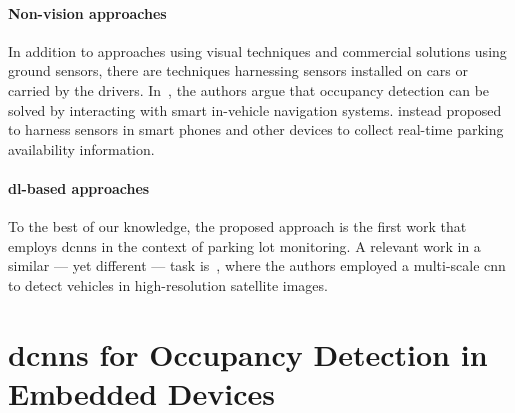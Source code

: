 \paragraph{Non-vision approaches}
In addition to approaches using visual techniques and commercial solutions using ground sensors, there are techniques harnessing sensors installed on cars or carried by the drivers.
In~\cite{caicedo2012prediction}, the authors argue that occupancy detection can be solved by interacting with smart in-vehicle navigation systems.
\citet{lan2014intelligent} instead proposed to harness sensors in smart phones and other devices to collect real-time parking availability information.
%
\paragraph{\gls{dl}-based approaches}
To the best of our knowledge, the proposed approach is the first work that employs \glspl{dcnn} in the context of parking lot monitoring.
A relevant work in a similar --- yet different --- task is~\cite{chen2014vehicle}, where the authors employed a multi-scale \gls{cnn} to detect vehicles in high-resolution satellite images.

\section{\glspl{dcnn} for Occupancy Detection in Embedded Devices}
\label{sec:mini:occupancy-detection}


